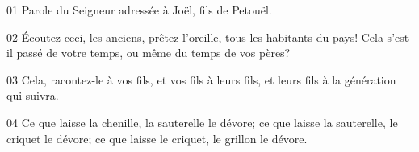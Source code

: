 01 Parole du Seigneur adressée à Joël, fils de Petouël.

02 Écoutez ceci, les anciens, prêtez l’oreille, tous les habitants du pays! Cela s’est-il passé de votre temps, ou même du temps de vos pères?

03 Cela, racontez-le à vos fils, et vos fils à leurs fils, et leurs fils à la génération qui suivra.

04 Ce que laisse la chenille, la sauterelle le dévore; ce que laisse la sauterelle, le criquet le dévore; ce que laisse le criquet, le grillon le dévore.

